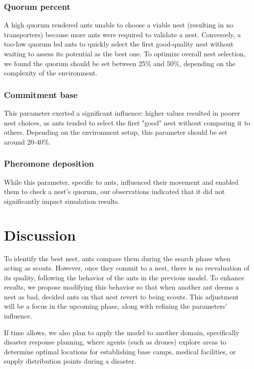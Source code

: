 \documentclass[9pt]{pnas-new}
\begin{document}
\subsubsection*{Quorum percent}
A high quorum rendered ants unable to choose a viable nest (resulting in no transporters) because more ants were required to validate a nest. Conversely, a too-low quorum led ants to quickly select the first good-quality nest without waiting to assess its potential as the best one. To optimize overall nest selection, we found the quorum should be set between 25\% and 50\%, depending on the complexity of the environment.

\subsubsection*{Commitment base}
This parameter exerted a significant influence: higher values resulted in poorer nest choices, as ants tended to select the first "good" nest without comparing it to others. Depending on the environment setup, this parameter should be set around 20-40\%.

\subsubsection*{Pheromone deposition}
While this parameter, specific to ants, influenced their movement and enabled them to check a nest's quorum, our observations indicated that it did not significantly impact simulation results.

\section*{Discussion}
To identify the best nest, ants compare them during the search phase when acting as scouts. However, once they commit to a nest, there is no reevaluation of its quality, following the behavior of the ants in the previous model. To enhance results, we propose modifying this behavior so that when another ant deems a nest as bad, decided ants on that nest revert to being scouts. This adjustment will be a focus in the upcoming phase, along with refining the parameters' influence. 

If time allows, we also plan to apply the model to another domain, specifically disaster response planning, where agents (such as drones) explore areas to determine optimal locations for establishing base camps, medical facilities, or supply distribution points during a disaster.\\\\
\end{document}
